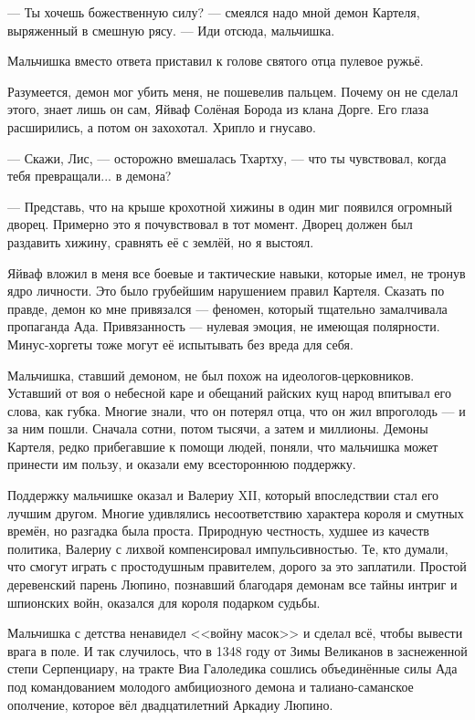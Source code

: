 --- Ты хочешь божественную силу? --- смеялся надо мной демон Картеля, выряженный в смешную рясу.
--- Иди отсюда, мальчишка.

Мальчишка вместо ответа приставил к голове святого отца пулевое ружьё.

Разумеется, демон мог убить меня, не пошевелив пальцем.
Почему он не сделал этого, знает лишь он сам, Яйваф Солёная Борода из клана Дорге.
Его глаза расширились, а потом он захохотал.
Хрипло и гнусаво.

--- Скажи, Лис, --- осторожно вмешалась Тхартху, --- что ты чувствовал, когда тебя превращали... в демона?

--- Представь, что на крыше крохотной хижины в один миг появился огромный дворец.
Примерно это я почувствовал в тот момент.
Дворец должен был раздавить хижину, сравнять её с землёй, но я выстоял.

Яйваф вложил в меня все боевые и тактические навыки, которые имел, не тронув ядро личности.
Это было грубейшим нарушением правил Картеля.
Сказать по правде, демон ко мне привязался --- феномен, который тщательно замалчивала пропаганда Ада.
Привязанность --- нулевая эмоция, не имеющая полярности.
Минус-хоргеты тоже могут её испытывать без вреда для себя.

Мальчишка, ставший демоном, не был похож на идеологов-церковников.
Уставший от воя о небесной каре и обещаний райских кущ народ впитывал его слова, как губка.
Многие знали, что он потерял отца, что он жил впроголодь --- и за ним пошли.
Сначала сотни, потом тысячи, а затем и миллионы.
Демоны Картеля, редко прибегавшие к помощи людей, поняли, что мальчишка может принести им пользу, и оказали ему всестороннюю поддержку.

Поддержку мальчишке оказал и Валериу XII, который впоследствии стал его лучшим другом.
Многие удивлялись несоответствию характера короля и смутных времён, но разгадка была проста.
Природную честность, худшее из качеств политика, Валериу с лихвой компенсировал импульсивностью.
Те, кто думали, что смогут играть с простодушным правителем, дорого за это заплатили.
Простой деревенский парень Люпино, познавший благодаря демонам все тайны интриг и шпионских войн, оказался для короля подарком судьбы.

Мальчишка с детства ненавидел <<войну масок>> и сделал всё, чтобы вывести врага в поле.
И так случилось, что в 1348 году от Зимы Великанов в заснеженной степи Серпенциару, на тракте Виа Галоледика сошлись объединённые силы Ада под командованием молодого амбициозного демона и талиано-саманское ополчение, которое вёл двадцатилетний Аркадиу Люпино.

